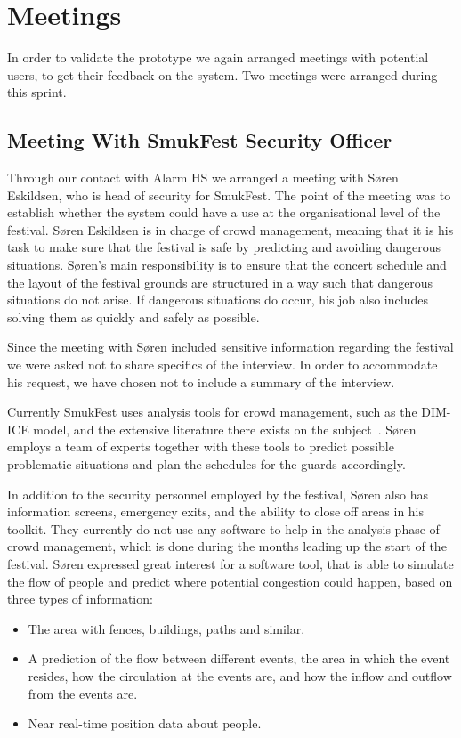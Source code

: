 \section{Meetings}

In order to validate the prototype we again arranged meetings with potential users, to get their feedback on the system. Two meetings were arranged during this sprint.

\subsection{Meeting With SmukFest Security Officer}

Through our contact with Alarm HS we arranged a meeting with Søren Eskildsen, who is head of security for SmukFest. The point of the meeting was to establish whether the system could have a use at the organisational level of the festival. Søren Eskildsen is in charge of crowd management, meaning that it is his task to make sure that the festival is safe by predicting and avoiding dangerous situations. Søren's main responsibility is to ensure that the concert schedule and the layout of the festival grounds are structured in a way such that dangerous situations do not arise. If dangerous situations do occur, his job also includes solving them as quickly and safely as possible.

Since the meeting with Søren included sensitive information regarding the festival we were asked not to share specifics of the interview. In order to accommodate his request, we have chosen not to include a summary of the interview.

Currently SmukFest uses analysis tools for crowd management, such as the DIM-ICE model, and the extensive literature there exists on the subject~\cite{dimice}. Søren employs a team of experts together with these tools to predict possible problematic situations and plan the schedules for the guards accordingly.

In addition to the security personnel employed by the festival, Søren also has information screens, emergency exits, and the ability to close off areas in his toolkit. They currently do not use any software to help in the analysis phase of crowd management, which is done during the months leading up the start of the festival. Søren expressed great interest for a software tool, that is able to simulate the flow of people and predict where potential congestion could happen, based on three types of information:

\begin{itemize}
    \item The area with fences, buildings, paths and similar.
    \item A prediction of the flow between different events, the area in which the event resides, how the circulation at the events are, and how the inflow and outflow from the events are.
    \item Near real-time position data about people.

\end{itemize}

